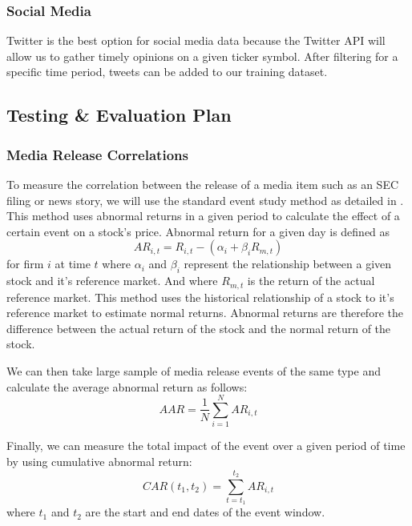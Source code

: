 \documentclass[conference]{IEEEtran}
\begin{document}
\subsubsection{Social Media}
Twitter is the best option for social media data because the Twitter API \cite{twitterapi} will allow us to gather timely opinions on a given ticker symbol. After filtering for a specific time period, tweets can be added to our training dataset.

\subsection{Testing \& Evaluation Plan}

\subsubsection{Media Release Correlations} \label{math}
To measure the correlation between the release of a media item such as an SEC filing or news story, we will use the standard event study method as detailed in \cite{Neuhierl2010}. This method uses abnormal returns in a given period to calculate the effect of a certain event on a stock's price. Abnormal return for a given day is defined as 
\begin{equation}
	AR_{i,t}=R_{i,t}-(\alpha_i+\beta_i R_{m,t})
\end{equation}
for firm $i$ at time $t$ where $\alpha_i$ and $\beta_i$ represent the relationship between a given stock and it's reference market. And where $R_{m,t}$ is the return of the actual reference market. This method uses the historical relationship of a stock to it's reference market to estimate normal returns. Abnormal returns are therefore the difference between the actual return of the stock and the normal return of the stock. 

We can then take large sample of media release events of the same type and calculate the average abnormal return as follows:
\begin{equation}
	AAR= \frac{1}{N} \sum\limits_{i=1}^{N}AR_{i,t}
\end{equation}

Finally, we can measure the total impact of the event over a given period of time by using cumulative abnormal return:
\begin{equation}
	CAR(t_1,t_2)=\sum\limits_{t=t_1}^{t_2} AR_{i,t} 
\end{equation}
where $t_1$ and $t_2$ are the start and end dates of the event window.
\end{document}
